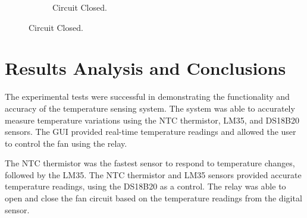 \documentclass[12pt]{article}
\begin{document}
\begin{figure}[H]
\begin{subfigure}{0.45\textwidth}
                \caption{Circuit Closed.}
                \label{fig:RelayClosed}
            \end{subfigure}
        \end{figure}

\newpage
\section{Results Analysis and Conclusions}

    The experimental tests were successful in demonstrating the functionality and accuracy of the temperature sensing system. The system was able to accurately measure temperature variations using the NTC thermistor, LM35, and DS18B20 sensors. The GUI provided real-time temperature readings and allowed the user to control the fan using the relay.

    The NTC thermistor was the fastest sensor to respond to temperature changes, followed by the LM35. The NTC thermistor and LM35 sensors provided accurate temperature readings, using the DS18B20 as a control. The relay was able to open and close the fan circuit based on the temperature readings from the digital sensor.
\end{document}
